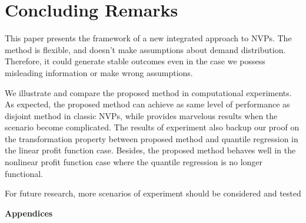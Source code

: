 \documentclass{article}
\begin{document}
\section{Concluding Remarks} \label{se:end}
This paper presents the framework of a new integrated approach to NVPs. The method is flexible, and doesn't make assumptions about demand distribution. Therefore, it could generate stable outcomes even in the case we possess misleading information or make wrong assumptions.

We illustrate and compare the proposed method in computational experiments. As expected, the proposed method can achieve as same level of performance as disjoint method in classic NVPs, while provides marvelous results when the scenario become complicated. The results of experiment also backup our proof on the transformation property between proposed method and quantile regression in the linear profit function case. Besides, the proposed method behaves well in the nonlinear profit function case where the quantile regression is no longer functional.

For future research, more scenarios of experiment should be considered and tested 
\printbibliography

\newpage
\begin{center}
{\bf\Large Appendices}
\end{center}

\appendix
\end{document}
